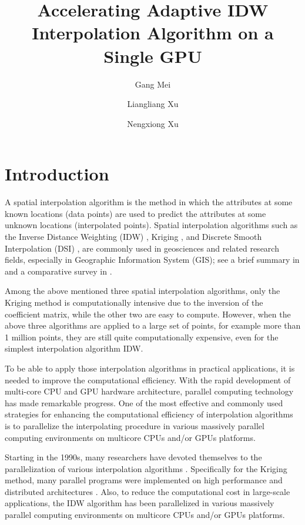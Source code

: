 \documentclass[fleqn,11pt]{wlscirep}
\title{Accelerating Adaptive IDW Interpolation Algorithm on a Single GPU}
\author[1,*]{Gang Mei}
\author[1]{Liangliang Xu}
\author[1,*]{Nengxiong Xu}
\affil[1]{School of Engineering and Technology, China University of Geosciences, Beijing, China}
\affil[*]{corresponding: \{gang.mei; xunengxiong\}@cugb.edu.cn}
\begin{document}
\flushbottom
\maketitle
\thispagestyle{empty}

\section{Introduction}
A spatial interpolation algorithm is the method in which the attributes at 
some known locations (data points) are used to predict the attributes at 
some unknown locations (interpolated points). Spatial interpolation 
algorithms such as the Inverse Distance Weighting (IDW) \cite{01}, Kriging \cite{02}, and Discrete Smooth Interpolation (DSI) \cite{03,04}, are 
commonly used in geosciences and related research fields, especially in 
Geographic Information System (GIS); see a brief summary in \cite{05} and 
a comparative survey in \cite{06}. 

Among the above mentioned three spatial interpolation algorithms, only the 
Kriging method is computationally intensive due to the inversion of the 
coefficient matrix, while the other two are easy to compute. However, when 
the above three algorithms are applied to a large set of points, for example 
more than 1 million points, they are still quite computationally expensive, 
even for the simplest interpolation algorithm IDW. 

To be able to apply those interpolation algorithms in practical 
applications, it is needed to improve the computational efficiency. With the 
rapid development of multi-core CPU and GPU hardware architecture, parallel 
computing technology has made remarkable progress. One of the most effective 
and commonly used strategies for enhancing the computational efficiency of 
interpolation algorithms is to parallelize the interpolating procedure in 
various massively parallel computing environments on multicore CPUs and/or 
GPUs platforms. 

Starting in the 1990s, many researchers have devoted themselves to the 
parallelization of various interpolation algorithms \cite{07,08,09,10,11}. Specifically 
for the Kriging method, many parallel programs were implemented on high 
performance and distributed architectures \cite{10,12,13,14,15,16,17,18,19,20}. Also, to reduce 
the computational cost in large-scale applications, the IDW algorithm has 
been parallelized in various massively parallel computing environments on 
multicore CPUs and/or GPUs platforms.
\end{document}

